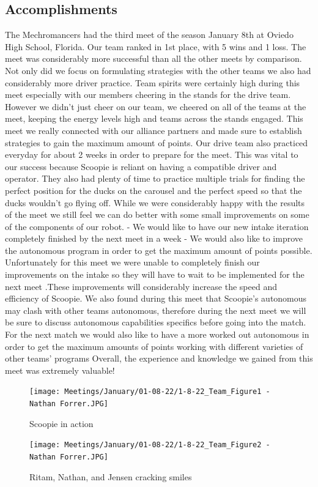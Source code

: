 \subsection*{Accomplishments}
The Mechromancers had the third meet of the season January 8th at Oviedo High School, Florida. Our team ranked in 1st place, with 5 wins and 1 loss. The meet was considerably more successful than all the other meets by comparison. Not only did we focus on formulating strategies with the other teams we also had considerably more driver practice. Team spirits were certainly high during this meet especially with our members cheering in the stands for the drive team. However we didn't just cheer on our team, we cheered on all of the teams at the meet, keeping the energy levels high and teams across the stands engaged. This meet we really connected with our alliance partners and made sure to establish strategies to gain the maximum amount of points. Our drive team also practiced everyday for about 2 weeks in order to prepare for the meet. This was vital to our success because Scoopie is reliant on having a compatible driver and operator. They also had plenty of time to practice multiple trials for finding the perfect position for the ducks on the carousel and the perfect speed so that the ducks wouldn’t go flying off. While we were considerably happy with the results of the meet we still feel we can do better with some small improvements on some of the components of our robot. 
- We would like to have our new intake iteration completely finished by the next meet in a week
- We would also like to improve the autonomous program in order to get the maximum amount of points possible.
Unfortunately for this meet we were unable to completely finish our improvements on the intake so they will have to wait to be implemented for the next meet .These improvements will considerably increase the speed and efficiency of Scoopie. We also found during this meet that Scoopie's autonomous may clash with other teams autonomous, therefore during the next meet we will be sure to discuss autonomous capabilities specifics before going into the match. For the next match we would also like to have a more worked out autonomous in order to get the maximum amounts of points working with different varieties of other teams’ programs 
Overall, the experience and knowledge we gained from this meet was extremely valuable! 

 

\begin{figure}[ht]
\centering
\begin{minipage}[b]{.48\textwidth}
  \centering
  \texttt{[image: Meetings/January/01-08-22/1-8-22\_Team\_Figure1 - Nathan Forrer.JPG]}
  \caption{Scoopie in action}
  \label{fig:010822_5}
\end{minipage}%
\hfill%
\begin{minipage}[b]{.48\textwidth}
  \centering
  \texttt{[image: Meetings/January/01-08-22/1-8-22\_Team\_Figure2 - Nathan Forrer.JPG]}
  \caption{Ritam, Nathan, and Jensen cracking smiles}
  \label{fig:010822_6}
\end{minipage}
\end{figure}

